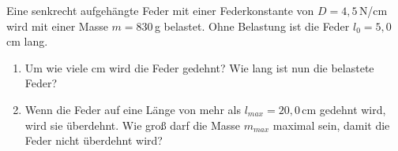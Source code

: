 \begin{ExerciseBlock}
Eine senkrecht aufgehängte Feder mit einer Federkonstante von $D = 4,5 \,$N/cm wird mit einer Masse $m=830\,$g belastet. Ohne Belastung ist die Feder $l_0=5,0\,$cm lang.

\begin{enumerate}
	\item Um wie viele cm wird die Feder gedehnt? Wie lang ist nun die belastete Feder?

	\item Wenn die Feder auf eine Länge von mehr als $l_{max}=20,0\,$cm gedehnt wird, wird sie überdehnt. Wie groß darf die Masse $m_{max}$ maximal sein, damit die Feder nicht überdehnt wird?

\end{enumerate}
\end{ExerciseBlock}
